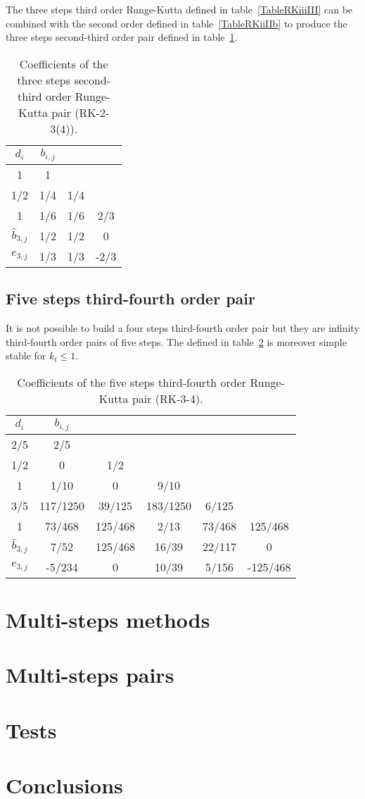 \documentclass[a4paper]{article}
\begin{document}
The three steps third order Runge-Kutta defined in table~\ref{TableRKiiiIII}
can be combined with the second order defined in table~\ref{TableRKiiIIb} to
produce the three steps second-third order pair defined in
table~\ref{TableRKIIiiiIII}.
\begin{table}[ht]
	\centering
	\begin{tabular}{c|ccc}
		$d_{i}$ & $b_{i,j}$ \\ \hline
		1 & 1 \\
		1/2 & 1/4 & 1/4 \\
		1 & 1/6 & 1/6 & 2/3 \\ \hline
		$\hat{b}_{3,j}$ & 1/2 & 1/2 & 0 \\ \hline
		$e_{3,j}$ & 1/3 & 1/3 & -2/3
	\end{tabular}
	\caption{Coefficients of the three steps second-third order Runge-Kutta pair
		(RK-2-3(4)).\label{TableRKIIiiiIII}}
\end{table}

\subsection{Five steps third-fourth order pair}

It is not possible to build a four steps third-fourth order pair but they are
infinity third-fourth order pairs of five steps. The defined in
table~\ref{TableRKIIIvIV} is moreover simple stable for $k_t\leq1$.
\begin{table}[ht]
	\centering
	\begin{tabular}{c|ccccc}
		$d_{i}$ & $b_{i,j}$ \\ \hline
		2/5 & 2/5 \\
		1/2 & 0 & 1/2 \\
		1 & 1/10 & 0 & 9/10 \\
		3/5 & 117/1250 & 39/125 & 183/1250 & 6/125 \\
		1 & 73/468 & 125/468 & 2/13 & 73/468 & 125/468 \\ \hline
		$\hat{b}_{3,j}$ & 7/52 & 125/468 & 16/39 & 22/117 & 0 \\ \hline
		$e_{3,j}$ & -5/234 & 0 & 10/39 & 5/156 & -125/468
	\end{tabular}
	\caption{Coefficients of the five steps third-fourth order Runge-Kutta pair
		(RK-3-4).\label{TableRKIIIvIV}}
\end{table}

\section{Multi-steps methods}

\section{Multi-steps pairs}

\section{Tests}

\section{Conclusions}
\end{document}
